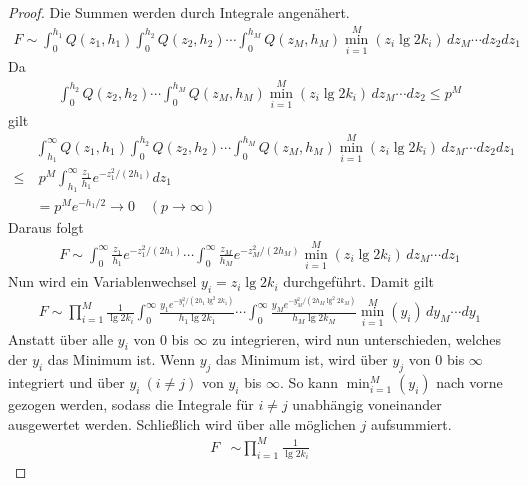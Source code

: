 \documentclass[a4paper, 11pt, ngerman]{article}
\theoremstyle{definition}
\theoremstyle{plain}
\theoremstyle{remark}
\begin{document}
\begin{proof}
    Die Summen werden durch Integrale angenähert.
    \begin{align*}
        F \sim
        \int_0^{h_1} Q(z_1, h_1)
        \int_0^{h_2} Q(z_2, h_2) \cdots
        \int_0^{h_M} Q(z_M, h_M)
        \min_{i = 1}^M(z_i \lg 2k_i) \, dz_M \cdots dz_2 dz_1
    \end{align*}
    Da
    \begin{align*}
        \int_0^{h_2} Q(z_2, h_2) \cdots \int_0^{h_M} Q(z_M, h_M)
        \min_{i = 1}^M(z_i \lg 2k_i) \, dz_M \cdots dz_2 \le p^M
    \end{align*}
    gilt
    \begin{align*}
            & \int_{h_1}^{\infty} Q(z_1, h_1)
        \int_0^{h_2} Q(z_2, h_2) \cdots
        \int_0^{h_M} Q(z_M, h_M)
        \min_{i = 1}^M(z_i \lg 2k_i) \, dz_M \cdots dz_2 dz_1 \\
        \le & \ p^M \int_{h_1}^{\infty}
        \frac {z_1} {h_1} e^{-z_1^2/(2h_1)} dz_1              \\
            & = p^M e^{-h_1/2} \to 0 \quad (p \to \infty)
    \end{align*}
    Daraus folgt
    \begin{align*}
        F \sim
        \int_0^{\infty}
        \frac {z_1} {h_1} e^{-z_1^2/(2h_1)} \cdots
        \int_0^{\infty}
        \frac {z_M} {h_M} e^{-z_M^2/(2h_M)}
        \min_{i = 1}^M(z_i \lg 2k_i) \, dz_M \cdots dz_1
    \end{align*}
    Nun wird ein Variablenwechsel $y_i = z_i \lg 2k_i$ durchgeführt. Damit gilt
    \begin{align*}
        F \sim
        \prod_{i = 1}^M \frac 1 {\lg 2k_i}
        \int_0^{\infty}
        \frac {y_1 e^{-y_1^2 / (2h_1 \lg^2 2k_1)}} {h_1\lg 2k_1}  \cdots
        \int_0^{\infty}
        \frac {y_M e^{-y_M^2 / (2h_M \lg^2 2k_M)}} {h_M \lg 2k_M}
        \min_{i = 1}^M(y_i) \, dy_M \cdots dy_1
    \end{align*}
    Anstatt über alle $y_i$ von $0$ bis $\infty$ zu integrieren, wird nun unterschieden, welches der $y_i$ das Minimum ist. Wenn $y_j$ das Minimum ist, wird über $y_j$ von $0$ bis $\infty$ integriert und über $y_i \ (i \ne j)$ von $y_i$ bis $\infty$. So kann $\min_{i = 1}^M (y_i)$ nach vorne gezogen werden, sodass die Integrale für $i \ne j$ unabhängig voneinander ausgewertet werden. Schließlich wird über alle möglichen $j$ aufsummiert.
    \begin{align*}
        F & \sim
        \prod_{i = 1}^M \frac 1 {\lg 2k_i}

\end{align*}
\end{proof}
\end{document}
